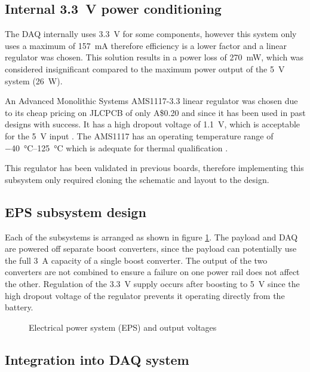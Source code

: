 \documentclass[]{report}
\newcommand{\aud}{A\$}
\begin{document}
\subsection{Internal \SI{3.3}{\volt} power conditioning}

The DAQ internally uses \SI{3.3}{\volt} for some components, however this system only uses a maximum of \SI{157}{\milli\ampere} therefore efficiency is a lower factor and a linear regulator was chosen. This solution results in a power loss of \SI{270}{\milli\watt}, which was considered insignificant compared to the maximum power output of the \SI{5}{\volt} system (\SI{26}{\watt}). %

An Advanced Monolithic Systems AMS1117-3.3 linear regulator was chosen due to its cheap pricing on JLCPCB of only \aud 0.20 and since it has been used in past designs with success. It has a high dropout voltage of \SI{1.1}{\volt}, which is acceptable for the \SI{5}{\volt} input \cite{ams2007ams1117}. The AMS1117 has an operating temperature range of \SIrange{-40}{125}{\degreeCelsius} which is adequate for thermal qualification \cite{ams2007ams1117}.

This regulator has been validated in previous boards, therefore implementing this subsystem only required cloning the schematic and layout to the design.

\subsection{EPS subsystem design}

Each of the subsystems is arranged as shown in figure \ref{fig:power-conditioning}. The payload and DAQ are powered off separate boost converters, since the payload can potentially use the full \SI{3}{\ampere} capacity of a single boost converter. The output of the two converters are not combined to ensure a failure on one power rail does not affect the other. Regulation of the \SI{3.3}{\volt} supply occurs after boosting to \SI{5}{\volt} since the high dropout voltage of the regulator prevents it operating directly from the battery.

\begin{figure}[H]
  \centering
  
  \caption{Electrical power system (EPS) and output voltages}
  \label{fig:power-conditioning}
\end{figure}

\subsection{Integration into DAQ system}
\end{document}
